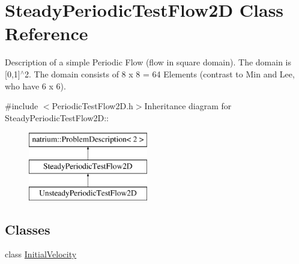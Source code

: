 \hypertarget{classSteadyPeriodicTestFlow2D}{
\section{SteadyPeriodicTestFlow2D Class Reference}
\label{classSteadyPeriodicTestFlow2D}
}


Description of a simple Periodic Flow (flow in square domain). The domain is \mbox{[}0,1\mbox{]}$^\wedge$2. The domain consists of 8 x 8 = 64 Elements (contrast to Min and Lee, who have 6 x 6).  


{\ttfamily \#include $<$PeriodicTestFlow2D.h$>$}Inheritance diagram for SteadyPeriodicTestFlow2D::\begin{figure}[H]
\begin{center}
\leavevmode
\includegraphics[height=3cm]{classSteadyPeriodicTestFlow2D}
\end{center}
\end{figure}
\subsection*{Classes}
\begin{DoxyCompactItemize}
\item 
class \hyperlink{classSteadyPeriodicTestFlow2D_1_1InitialVelocity}{InitialVelocity}
\end{DoxyCompactItemize}
